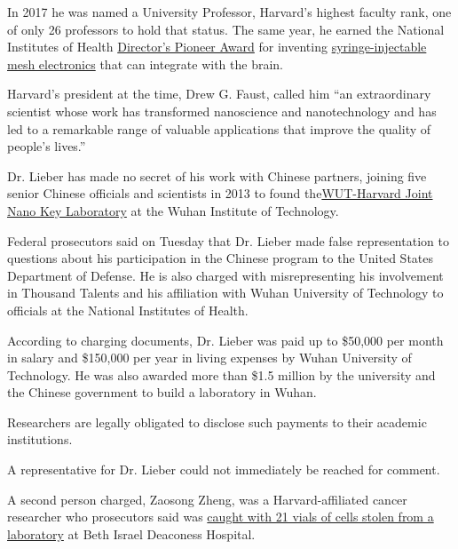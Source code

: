 In 2017 he was named a University Professor, Harvard's highest faculty
rank, one of only 26 professors to hold that status. The same year, he
earned the National Institutes of Health
\href{https://web.archive.org/web/20200128165017/https://commonfund.nih.gov/pioneer}{Director's
Pioneer Award} for inventing
\href{https://web.archive.org/web/20200128165017/https://commonfund.nih.gov/pioneer/AwardRecipients17}{syringe-injectable
mesh electronics} that can integrate with the brain.

Harvard's president at the time, Drew G. Faust, called him ``an
extraordinary scientist whose work has transformed nanoscience and
nanotechnology and has led to a remarkable range of valuable
applications that improve the quality of people's lives.''

Dr. Lieber has made no secret of his work with Chinese partners, joining
five senior Chinese officials and scientists in 2013 to found
the\href{https://web.archive.org/web/20200128165017/http://english.whut.edu.cn/wn/201301/t20130104_91316.htmlhttp://english.whut.edu.cn/wn/201301/t20130104_91316.html}{WUT-Harvard
Joint Nano Key Laboratory} at the Wuhan Institute of Technology.

Federal prosecutors said on Tuesday that Dr. Lieber made false
representation to questions about his participation in the Chinese
program to the United States Department of Defense. He is also charged
with misrepresenting his involvement in Thousand Talents and his
affiliation with Wuhan University of Technology to officials at the
National Institutes of Health.

According to charging documents, Dr. Lieber was paid up to \$50,000 per
month in salary and \$150,000 per year in living expenses by Wuhan
University of Technology. He was also awarded more than \$1.5 million by
the university and the Chinese government to build a laboratory in
Wuhan.

Researchers are legally obligated to disclose such payments to their
academic institutions.

A representative for Dr. Lieber could not immediately be reached for
comment.

A second person charged, Zaosong Zheng, was a Harvard-affiliated cancer
researcher who prosecutors said was
\href{https://web.archive.org/web/20200128165017/https://www.nytimes.com/2019/12/31/us/chinese-scientist-cancer-research-investigation.html}{caught
with 21 vials of cells stolen from a laboratory} at Beth Israel
Deaconess Hospital.

